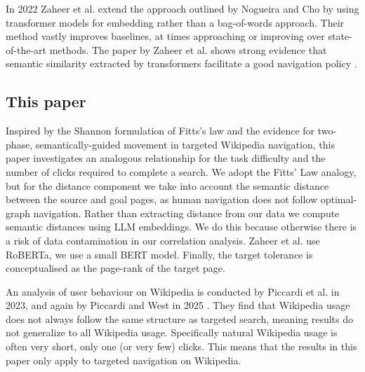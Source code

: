 In 2022 Zaheer et al. extend the approach outlined by Nogueira and Cho by using transformer models for embedding rather than a bag-of-words approach\cite{embeddingrandomwalks}. Their method vastly improves baselines, at times approaching or improving over state-of-the-art methods. The paper by Zaheer et al. shows strong evidence that semantic similarity extracted by transformers facilitate a good navigation policy .

\subsection{This paper}
Inspired by the Shannon formulation of Fitts's law and the evidence for two-phase, semantically-guided movement in targeted Wikipedia navigation, this paper investigates an analogous relationship for the task difficulty and the number of clicks required to complete a search. We adopt the Fitts' Law analogy, but for the distance component we take into account the semantic distance between the source and goal pages, as human navigation does not follow optimal-graph navigation. Rather than extracting distance from our data we compute semantic distances using LLM embeddings. We do this because otherwise there is a risk of data contamination in our correlation analysis. Zaheer et al. use RoBERTa\cite{embeddingrandomwalks}, we use a small BERT model. Finally, the target tolerance is conceptualised as the page-rank of the target page.

An analysis of user behaviour on Wikipedia is conducted by Piccardi et al. in 2023\cite{overviewwikipedianavigation}, and again by Piccardi and West in 2025 \cite{overviewwikipedianavigation2}. They find that Wikipedia usage does not always follow the same structure as targeted search, meaning results do not generalize to all Wikipedia usage. Specifically natural Wikipedia usage is often very short, only one (or very few) clicks. This means that the results in this paper only apply to targeted navigation on Wikipedia.
%



